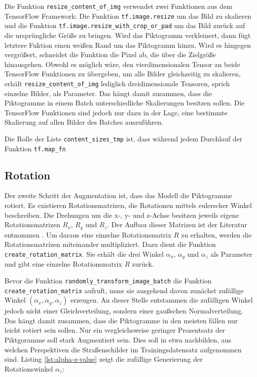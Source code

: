 Die Funktion \texttt{resize_content_of_img} verwendet zwei Funktionen aus dem TensorFlow Framework: Die Funktion \texttt{tf.image.resize} um das Bild zu skalieren und die Funktion \texttt{tf.image.resize_with_crop_or_pad} um das Bild zurück auf die ursprüngliche Größe zu bringen. Wird das Piktogramm verkleinert, dann fügt letztere Fuktion einen weißen Rand um das Piktogramm hinzu. Wird es hingegen vergrößert, schneidet die Funktion die Pixel ab, die über die Zielgröße hinausgehen. Obwohl es möglich wäre, den vierdimensionalen Tensor an beide TensorFlow Funktionen zu übergeben, um alle Bilder gleichzeitig zu skalieren, erhält \texttt{resize_content_of_img} lediglich dreidimensionale Tensoren, sprich einzelne Bilder, als Parameter. Das hängt damit zusammen, dass die Piktogramme in einem Batch unterschiedliche Skalierungen besitzen sollen. Die TensorFlow Funktionen sind jedoch nur dazu in der Lage, eine bestimmte Skalierung auf allen Bilder des Batches auszuführen.

Die Rolle der Liste \texttt{content_sizes_tmp} ist, dass während jedem Durchlauf der Funktion \texttt{tf.map_fn}

\subsection{Rotation}
Der zweite Schritt der Augmentation ist, dass das Modell die Piktogramme rotiert. Es existieren Rotationsmatrizen, die Rotationen mittels eulerscher Winkel beschreiben. Die Drehungen um die x-, y- und z-Achse besitzen jeweils eigene Rotationsmatrizen $R_x$, $R_y$ und $R_z$. Der Aufbau dieser Matrizen ist der Literatur entnommen \cite{math-primer}. Um daraus eine einzelne Rotationsmatrix $R$ zu erhalten, werden die Rotationsmatrizen miteinander multipliziert. Dazu dient die Funktion \texttt{create_rotation_matrix}. Sie erhält die drei Winkel $\alpha_x$, $\alpha_y$ und $\alpha_z$ als Parameter und gibt eine einzelne Rotationsmatrix $R$ zurück.

Bevor die Funktion \texttt{randomly_transform_image_batch} die Funktion \texttt{create_rotation_matrix} aufruft, muss sie ausgehend davon zunächst zufällige Winkel $(\alpha_x, \alpha_y, \alpha_z)$ erzeugen. An dieser Stelle entstammen die zufälligen Winkel jedoch nicht einer Gleichverteilung, sondern einer gaußschen Normalverteilung. Das hängt damit zusammen, dass die Piktogramme in den meisten fällen nur leicht rotiert sein sollen. Nur ein vergleichsweise geringer Prozentsatz der Piktgoramme soll stark Augmentiert sein. Dies soll in etwa nachbilden, aus welchen Perspektiven die Straßenschilder im Trainingsdatensatz aufgenommen sind. Listing \ref{lst:alpha-z-value} zeigt die zufällige Generierung der Rotationswinkel $\alpha_z$:

